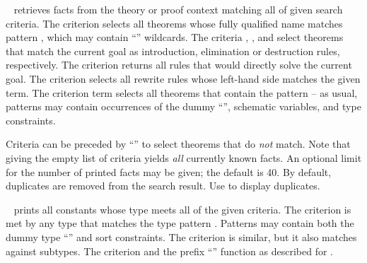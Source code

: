 \begin{isabellebody}
\begin{isamarkuptext}
\begin{description}
  \item \hyperlink{command.find-theorems}{\mbox{}}~ retrieves facts
  from the theory or proof context matching all of given search
  criteria.  The criterion  selects all theorems
  whose fully qualified name matches pattern , which may
  contain ``'' wildcards.  The criteria ,
  , and  select theorems that match the
  current goal as introduction, elimination or destruction rules,
  respectively.  The criterion  returns all rules
  that would directly solve the current goal.  The criterion
   selects all rewrite rules whose left-hand side
  matches the given term.  The criterion term  selects all
  theorems that contain the pattern  -- as usual, patterns
  may contain occurrences of the dummy ``'', schematic
  variables, and type constraints.
  
  Criteria can be preceded by ``'' to select theorems that
  do \emph{not} match. Note that giving the empty list of criteria
  yields \emph{all} currently known facts.  An optional limit for the
  number of printed facts may be given; the default is 40.  By
  default, duplicates are removed from the search result. Use
   to display duplicates.

  \item \hyperlink{command.find-consts}{\mbox{}}~ prints all constants
  whose type meets all of the given criteria. The criterion  is met by any type that matches the type pattern
  .  Patterns may contain both the dummy type ``''
  and sort constraints. The criterion  is similar, but it
  also matches against subtypes. The criterion  and
  the prefix ``'' function as described for \hyperlink{command.find-theorems}{\mbox{}}.


\end{description}
\end{isamarkuptext}
\end{isabellebody}
